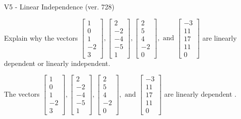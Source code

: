 \begin{exercise}
  \begin{exerciseTitle}V5 - Linear Independence (ver. 728)\end{exerciseTitle}
  \begin{exerciseStatement}
    Explain why the vectors \(\left[\begin{array}{r}
1 \\
0 \\
1 \\
-2 \\
3
\end{array}\right] , \left[\begin{array}{r}
2 \\
-2 \\
-4 \\
-5 \\
1
\end{array}\right] , \left[\begin{array}{r}
2 \\
5 \\
4 \\
-2 \\
0
\end{array}\right] , \text{ and } \left[\begin{array}{r}
-3 \\
11 \\
17 \\
11 \\
0
\end{array}\right]\) are linearly dependent or linearly independent.	


  \end{exerciseStatement}
  \begin{exerciseAnswer}
   The vectors \(\left[\begin{array}{r}
1 \\
0 \\
1 \\
-2 \\
3
\end{array}\right] , \left[\begin{array}{r}
2 \\
-2 \\
-4 \\
-5 \\
1
\end{array}\right] , \left[\begin{array}{r}
2 \\
5 \\
4 \\
-2 \\
0
\end{array}\right] , \text{ and } \left[\begin{array}{r}
-3 \\
11 \\
17 \\
11 \\
0
\end{array}\right]\) are 
  	 linearly dependent  .
  


  \end{exerciseAnswer}
\end{exercise}